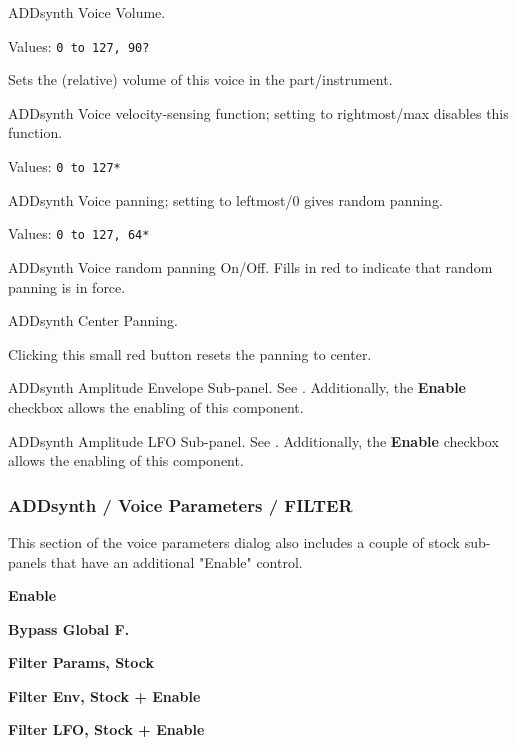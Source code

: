    ADDsynth Voice Volume.

   Values: \texttt{0 to 127, 90?}

   Sets the (relative) volume of this voice in the part/instrument.

   ADDsynth Voice velocity-sensing function; setting to rightmost/max
   disables this function.

   Values: \texttt{0 to 127*}

   ADDsynth Voice panning; setting to leftmost/0 gives random panning.

   Values: \texttt{0 to 127, 64*}

   ADDsynth Voice random panning On/Off.
   Fills in red to indicate that random panning is in force.

   ADDsynth Center Panning.

   Clicking this small red button resets the panning to center.

   ADDsynth Amplitude Envelope Sub-panel.
   See .
   Additionally, the \textbf{Enable} checkbox allows the enabling of this
   component.

   ADDsynth Amplitude LFO Sub-panel.
   See .
   Additionally, the \textbf{Enable} checkbox allows the enabling of this
   component.

\subsubsection{ADDsynth / Voice Parameters / FILTER}
\label{subsubsec:addsynth_voice_parameters_filter}

   This section of the voice parameters dialog also includes a couple of
   stock sub-panels that have an additional "Enable" control.

   \begin{enumber}
      \item \textbf{Enable}
      \item \textbf{Bypass Global F.}
      \item \textbf{Filter Params, Stock}
      \item \textbf{Filter Env, Stock + Enable}
      \item \textbf{Filter LFO, Stock + Enable}
   \end{enumber}

